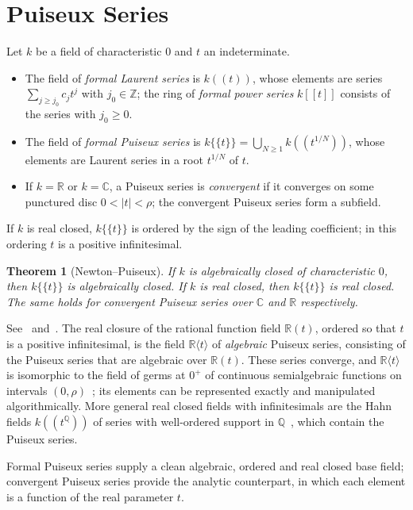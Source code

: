 \documentclass[12pt, a4paper]{report}
\theoremstyle{plain}
\newtheorem{theorem}{Theorem}[chapter]
\theoremstyle{definition}
\theoremstyle{remark}
\theoremstyle{plain}
\newcommand{\RR}{\mathbb{R}}
\newcommand{\CC}{\mathbb{C}}
\newcommand{\QQ}{\mathbb{Q}}
\newcommand{\ZZ}{\mathbb{Z}}
\begin{document}
\section{Puiseux Series}
\label{sec:puiseux}
Let $k$ be a field of characteristic $0$ and $t$ an indeterminate.
\begin{itemize}[leftmargin=1.25em]
  \item The field of \emph{formal Laurent series} is $k((t))$, whose elements are series $\sum_{j\geq j_0}c_jt^j$ with $j_0\in\ZZ$; the ring of \emph{formal power series} $k[[t]]$ consists of the series with $j_0\geq0$.
  \item The field of \emph{formal Puiseux series} is $k\{\{t\}\}=\bigcup_{N\geq1}k((t^{1/N}))$, whose elements are Laurent series in a root $t^{1/N}$ of $t$.
  \item If $k=\RR$ or $k=\CC$, a Puiseux series is \emph{convergent} if it converges on some punctured disc $0<|t|<\rho$; the convergent Puiseux series form a subfield.
\end{itemize}
If $k$ is real closed, $k\{\{t\}\}$ is ordered by the sign of the leading coefficient; in this ordering $t$ is a positive infinitesimal.

\begin{theorem}[Newton--Puiseux]\label{thm:newton-puiseux}
If $k$ is algebraically closed of characteristic $0$, then $k\{\{t\}\}$ is algebraically closed. If $k$ is real closed, then $k\{\{t\}\}$ is real closed. The same holds for convergent Puiseux series over $\CC$ and $\RR$ respectively.
\end{theorem}
See~\cite[\S2.6]{BasuPollackRoy2006} and~\cite{BochnakCosteRoy1998}. The real closure of the rational function field $\RR(t)$, ordered so that $t$ is a positive infinitesimal, is the field $\RR\langle t\rangle$ of \emph{algebraic} Puiseux series, consisting of the Puiseux series that are algebraic over $\RR(t)$. These series converge, and $\RR\langle t\rangle$ is isomorphic to the field of germs at $0^+$ of continuous semialgebraic functions on intervals $(0,\rho)$~\cite[\S2.6 and Chapter~3]{BasuPollackRoy2006}; its elements can be represented exactly and manipulated algorithmically. More general real closed fields with infinitesimals are the Hahn fields $k((t^{\QQ}))$ of series with well-ordered support in $\QQ$~\cite{Ribenboim1999}, which contain the Puiseux series.

Formal Puiseux series supply a clean algebraic, ordered and real closed base field; convergent Puiseux series provide the analytic counterpart, in which each element is a function of the real parameter $t$.
\end{document}

